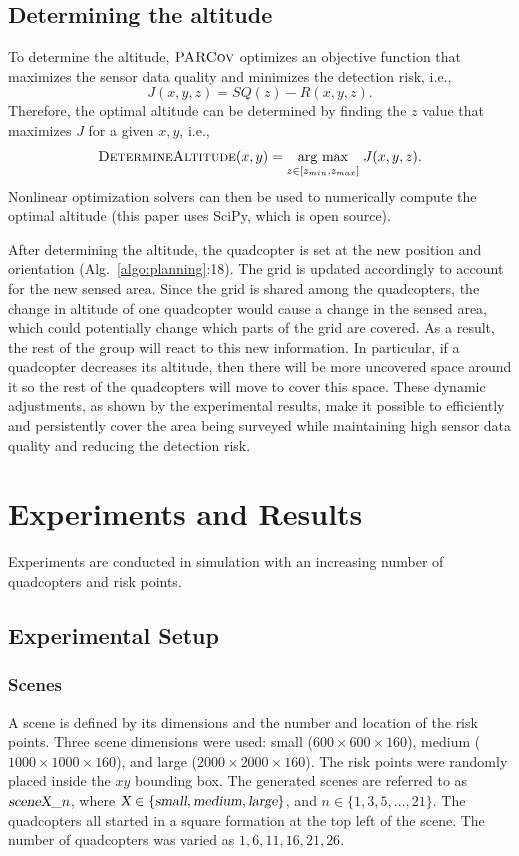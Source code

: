 \documentclass[letterpaper, 10pt, conference]{ieeeconf}
\newcommand{\Function}[1]{\ensuremath{{ \textsc{#1}}}}
\newcommand{\Var}[1]{\ensuremath{{{\textsl{#1}}}}}
\newcommand{\Name}{\Function{\small{PARCov}}}
\newcommand{\argmax}[1]{\underset{#1}{\operatorname{arg}\,\operatorname{max}}\;}
\begin{document}
\subsection{Determining the altitude}
\label{sec:Altitude}
To determine the altitude, $\Name$ optimizes an objective function
that maximizes the sensor data quality and
minimizes the detection risk, i.e.,
$$
J(x, y, z) = SQ(z) - R(x, y, z).
$$
Therefore, the optimal altitude can be determined by finding the $z$ value
that maximizes $J$ for a given $x, y$, i.e.,
$$ \Function{DetermineAltitude}(x, y) = \argmax{z \in [z_{min}, z_{max}]} J(x, y,
z).
$$
Nonlinear optimization solvers can then be used to numerically compute
the optimal altitude (this paper uses SciPy, which is open source).

After determining the altitude, the quadcopter is set at the new
position and orientation (Alg.~\ref{algo:planning}:18). The grid is updated accordingly to account
for the new sensed area. Since the grid is
shared among the quadcopters, the change in altitude of one quadcopter
would cause a change in the sensed area,
which could potentially change which parts of the grid are covered. As
a result, the rest of the group will react to this new information. In
particular, if a quadcopter decreases its altitude, then there will be
more uncovered space around it so the rest of the quadcopters will
move to cover this space. These dynamic adjustments, as shown by the
experimental results, make it possible to efficiently and persistently
cover the area being surveyed while maintaining high sensor data quality
and reducing the detection risk.




\section{Experiments and Results}
\label{sec:ExpResults}

Experiments are conducted in simulation with an increasing number of
quadcopters and risk points.  

\subsection{Experimental Setup}
\subsubsection{Scenes}
A scene is defined by its dimensions and the number and location of
the risk points. Three scene dimensions were used: small ($600 \times
600 \times 160$), medium ($1000 \times 1000 \times 160$), and large
($2000 \times 2000 \times 160$). The risk points were randomly placed
inside the $xy$ bounding box. The generated scenes are referred to as
$\Var{sceneX}\_n$, where $\Var{X} \in \{\Var{small}, \Var{medium},
\Var{large}\}$, and $n \in \{1, 3, 5, \ldots, 21\}$.  The quadcopters
all started in a square formation at the top left of the scene.  The
number of quadcopters was varied as $1, 6, 11, 16, 21, 26$.
\end{document}
